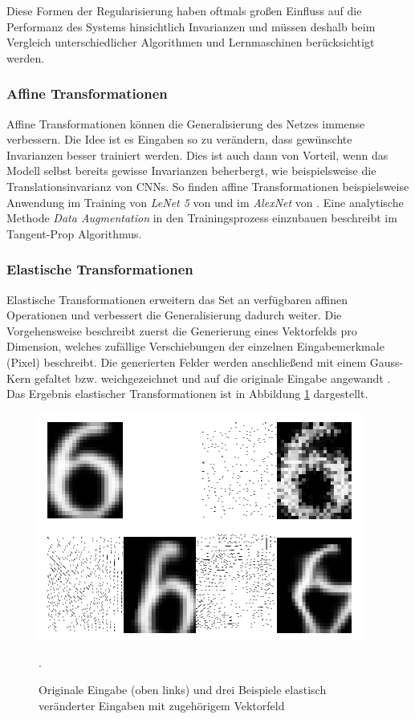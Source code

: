 Diese Formen der Regularisierung haben oftmals großen Einfluss auf die Performanz des Systems hinsichtlich Invarianzen und müssen deshalb beim Vergleich unterschiedlicher Algorithmen und Lernmaschinen berücksichtigt werden.
\cite[vgl.][Kap. 7.5, S. 210 f.]{Bengio2015}



\subsubsection{Affine Transformationen}
Affine Transformationen können die Generalisierung des Netzes immense verbessern. Die Idee ist es Eingaben so zu verändern, dass gewünschte Invarianzen besser trainiert werden. Dies ist auch dann von Vorteil, wenn das Modell selbst bereits gewisse Invarianzen beherbergt, wie beispielsweise die Translationsinvarianz von CNNs. So finden affine Transformationen beispielsweise Anwendung im Training von \textit{LeNet 5} von \cite{LeCun1998} und im \textit{AlexNet} von \cite{Krizhevsky2012}.
Eine analytische Methode \textit{Data Augmentation} in den Trainingsprozess einzubauen beschreibt \cite{Simard92} im Tangent-Prop Algorithmus.


\subsubsection{Elastische Transformationen}
Elastische Transformationen erweitern das Set an verfügbaren affinen Operationen und verbessert die Generalisierung dadurch weiter. 
Die Vorgehensweise beschreibt zuerst die Generierung eines Vektorfelds pro Dimension, welches zufällige Verschiebungen der einzelnen Eingabemerkmale (Pixel) beschreibt. Die generierten Felder werden anschließend mit einem Gauss-Kern gefaltet bzw. weichgezeichnet und auf die originale Eingabe angewandt \cite[vgl.][]{Simard2003}.
Das Ergebnis elastischer Transformationen ist in Abbildung \ref{fig:4_elastic} dargestellt.

\begin{figure}
\centering
\includegraphics[width=0.5\linewidth]{images/4_elastic}
\caption[]{Originale Eingabe (oben links) und drei Beispiele elastisch veränderter Eingaben mit zugehörigem Vektorfeld \cite[siehe][]{Simard2003}}.
\label{fig:4_elastic}
\end{figure}


